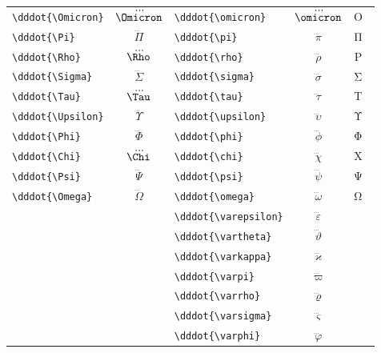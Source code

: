 \documentclass[12pt,a4paper]{article}
\begin{document}
\begin{longtable}{|l|c|l|c|c|}
\verb|\dddot{\Omicron}|    & $\dddot{\Omicron}$ & \verb|\dddot{\omicron}|    & $\dddot{\omicron}$    & Ο⃛ ο⃛ \\
\verb|\dddot{\Pi}|         & $\dddot{\Pi}$      & \verb|\dddot{\pi}|         & $\dddot{\pi}$         & Π⃛ π⃛ \\
\verb|\dddot{\Rho}|        & $\dddot{\Rho}$     & \verb|\dddot{\rho}|        & $\dddot{\rho}$        & Ρ⃛ ρ⃛ \\
\verb|\dddot{\Sigma}|      & $\dddot{\Sigma}$   & \verb|\dddot{\sigma}|      & $\dddot{\sigma}$      & Σ⃛ σ⃛ \\
\verb|\dddot{\Tau}|        & $\dddot{\Tau}$     & \verb|\dddot{\tau}|        & $\dddot{\tau}$        & Τ⃛ τ⃛ \\
\verb|\dddot{\Upsilon}|    & $\dddot{\Upsilon}$ & \verb|\dddot{\upsilon}|    & $\dddot{\upsilon}$    & Υ⃛ υ⃛ \\
\verb|\dddot{\Phi}|        & $\dddot{\Phi}$     & \verb|\dddot{\phi}|        & $\dddot{\phi}$        & Φ⃛ φ⃛ \\
\verb|\dddot{\Chi}|        & $\dddot{\Chi}$     & \verb|\dddot{\chi}|        & $\dddot{\chi}$        & Χ⃛ χ⃛ \\
\verb|\dddot{\Psi}|        & $\dddot{\Psi}$     & \verb|\dddot{\psi}|        & $\dddot{\psi}$        & Ψ⃛ ψ⃛ \\
\verb|\dddot{\Omega}|      & $\dddot{\Omega}$   & \verb|\dddot{\omega}|      & $\dddot{\omega}$      & Ω⃛ ω⃛ \\
                           &                    & \verb|\dddot{\varepsilon}| & $\dddot{\varepsilon}$ & ε⃛ \\
                           &                    & \verb|\dddot{\vartheta}|   & $\dddot{\vartheta}$   & ϑ⃛ \\
                           &                    & \verb|\dddot{\varkappa}|   & $\dddot{\varkappa}$   & ϰ⃛ \\
                           &                    & \verb|\dddot{\varpi}|      & $\dddot{\varpi}$      & ϖ⃛ \\
                           &                    & \verb|\dddot{\varrho}|     & $\dddot{\varrho}$     & ϱ⃛ \\
                           &                    & \verb|\dddot{\varsigma}|   & $\dddot{\varsigma}$   & ς⃛ \\
                           &                    & \verb|\dddot{\varphi}|     & $\dddot{\varphi}$     & ϕ⃛ \\
\hline
\end{longtable}
\end{document}
